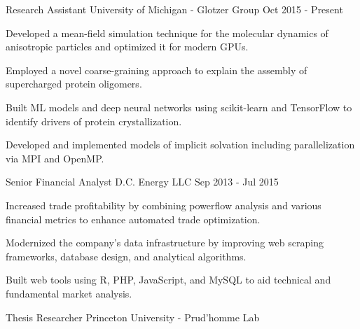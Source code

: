 \newcommand{\ecoli}{\emph{E. coli }}
\newcommand{\ejub}{\emph{E. jubatus }}
\newcommand{\gal}{\emph{G. g. domesticus}}
\begin{cventries}
  \cventry
    {Research Assistant} %
    {University of Michigan - Glotzer Group} %
    {} %
    {Oct 2015 - Present} %
    {
      \begin{cvitems} %
        \item Developed a mean-field simulation technique for the molecular dynamics of anisotropic particles and optimized it for modern GPUs.
        \item Employed a novel coarse-graining approach to explain the assembly of supercharged protein oligomers.
        \item Built ML models and deep neural networks using scikit-learn and TensorFlow to identify drivers of protein crystallization.
        \item Developed and implemented models of implicit solvation including parallelization via MPI and OpenMP.
      \end{cvitems}
    }
  \cventry
    {Senior Financial Analyst} %
    {D.C. Energy LLC} %
    {} %
    {Sep 2013 - Jul 2015} %
    {
      \begin{cvitems} %
        \item{Increased trade profitability by combining powerflow analysis and various financial metrics to enhance automated trade optimization.}
        \item {Modernized the company's data infrastructure by improving web scraping frameworks, database design, and analytical algorithms.}
        \item {Built web tools using R, PHP, JavaScript, and MySQL to aid technical and fundamental market analysis.}
      \end{cvitems}
    }
  \cventry
    {Thesis Researcher} %
    {Princeton University - Prud'homme Lab} %

\end{cventries}
